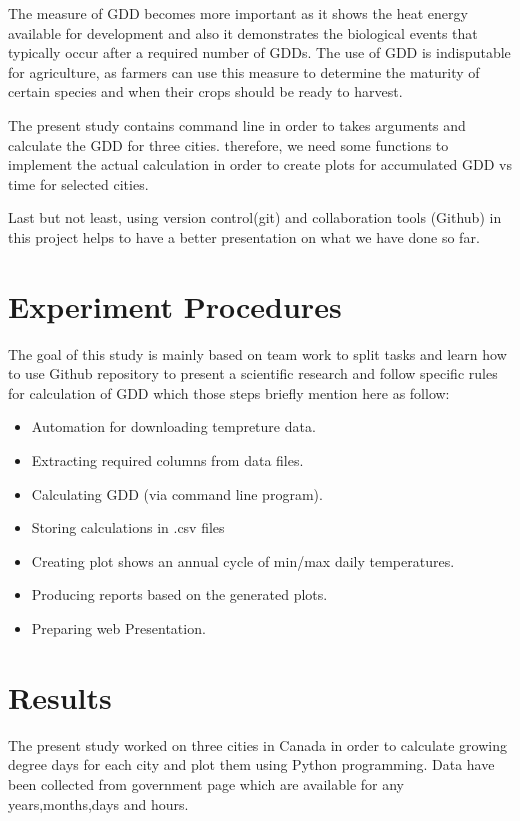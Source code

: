 \documentclass[DIV=calc, paper=a4, fontsize=11pt, twocolumn]{scrartcl}
\begin{document}
The measure of GDD becomes more important as it shows the heat energy available for development and also it demonstrates the biological events that typically occur after a required number of GDDs. The use of GDD is indisputable for agriculture, as farmers can use this measure to determine the maturity of certain species and when their crops should be ready to harvest.

The present study contains command line in order to takes arguments and calculate the GDD for three cities. therefore, we need some functions to implement the actual calculation in order to create plots for accumulated GDD vs time for selected cities.

Last but not least, using version control(git) and collaboration tools (Github) in this project helps to have a better presentation on what we have done so far.


\section{Experiment Procedures}
The goal of this study is mainly based on team work to split tasks and learn how to use Github repository to present a scientific research and follow specific rules for calculation of GDD which those steps briefly mention here as follow:

\begin{itemize}
\item Automation for downloading tempreture data.
\item Extracting required columns from data files.
\item Calculating GDD (via command line program).
\item Storing calculations in .csv files
\item Creating plot shows an annual cycle of min/max daily temperatures.
\item Producing reports based on the generated plots.
\item Preparing web Presentation.
\end{itemize}
\section{Results}
The present study worked on three cities in Canada in order to calculate growing degree days for each city and plot them using Python programming. Data have been collected from government page which are available for any years,months,days and hours. 
\end{document}

